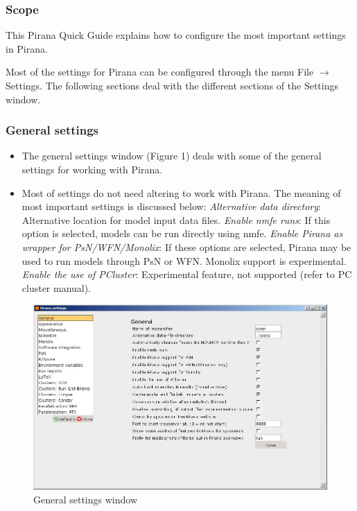 
\begin{center}
   {\colorbox{grey2}{
         \begin{minipage}[t]{0.9\textwidth}
\subsubsection*{Scope}
This Pirana Quick Guide explains how to configure the most important settings in Pirana. 
          \end{minipage}
      }
   }
\end{center}

Most of the settings for Pirana can be configured through the menu File $\rightarrow$ Settings. The following sections deal with the different sections of the Settings window.

\subsubsection*{General settings}
\begin{itemize}
\item The general settings window (Figure 1) deals with some of the general settings for working with Pirana.
\item Most of settings do not need altering to work with Pirana. The meaning of most important settings is discussed below:
\subitem \emph{Alternative data directory}: Alternative location for model input data files.
\subitem \emph{Enable nmfe runs}: If this option is selected, models can be run directly using nmfe.
\subitem \emph{Enable Pirana as wrapper for PsN/WFN/Monolix}: If these options are selected, Pirana may be used to run models through PsN or WFN. Monolix support is experimental.
\subitem \emph{Enable the use of PCluster}: Experimental feature, not supported (refer to PC cluster manual).
\end{itemize}


\begin{figure}[h] \centering
    \includegraphics[scale=.4]{images/settings_1.jpg}
    \caption{General settings window}
\end{figure}

